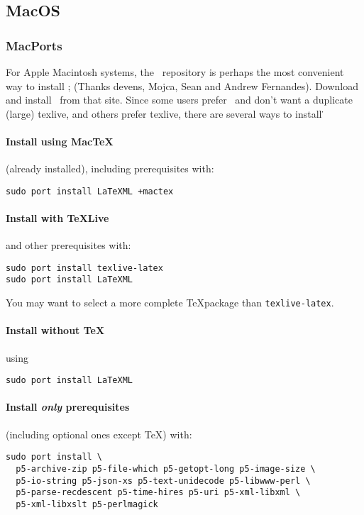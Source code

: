 \documentclass{article}
\begin{document}
\subsection{MacOS}\label{get.macos}

\subsubsection{MacPorts}\label{get.macos.macports}
For Apple Macintosh systems, the  \MacPorts\
repository is perhaps the most convenient way to install \LaTeXML;
(Thanks devens, Mojca, Sean and Andrew Fernandes).
Download and install \MacPorts\ from that site.
Since some users prefer \MacTeX\ and don't want a duplicate (large) texlive,
and others prefer texlive, there are several ways to install \LaTeXML\. 

\paragraph*{Install using MacTeX} (already installed), including prerequisites with:
\begin{lstlisting}[style=shell]
sudo port install LaTeXML +mactex
\end{lstlisting}

\paragraph*{Install with TeXLive} and other prerequisites with:
\begin{lstlisting}[style=shell]
sudo port install texlive-latex
sudo port install LaTeXML
\end{lstlisting}
You may want to select a more complete \TeX package than \texttt{texlive-latex}.

\paragraph*{Install without \TeX} using
\begin{lstlisting}[style=shell]
sudo port install LaTeXML
\end{lstlisting}

\paragraph*{Install \emph{only} prerequisites}\label{get.macos.macports.prereq}
(including optional ones except \TeX) with:
\begin{lstlisting}[style=shell]
sudo port install \
  p5-archive-zip p5-file-which p5-getopt-long p5-image-size \
  p5-io-string p5-json-xs p5-text-unidecode p5-libwww-perl \
  p5-parse-recdescent p5-time-hires p5-uri p5-xml-libxml \
  p5-xml-libxslt p5-perlmagick
\end{lstlisting}
\end{document}
